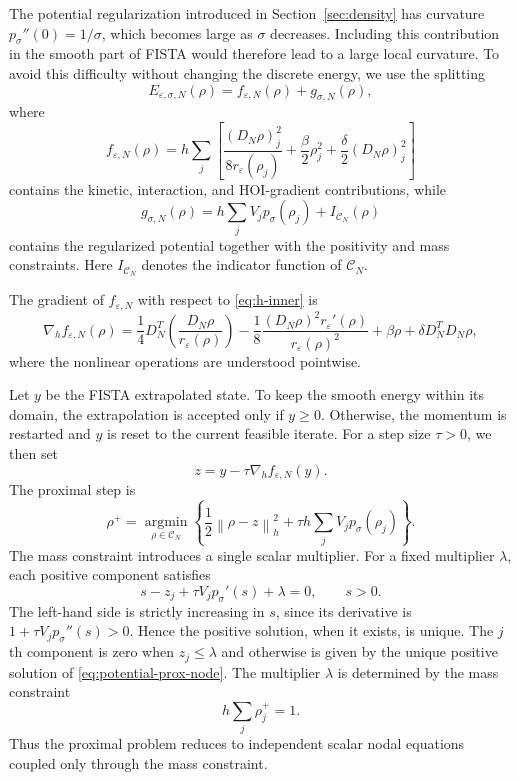 \documentclass[11pt]{article}
\newcommand{\CN}{\mathcal{C}_N}
\newcommand{\eps}{\varepsilon}
\newcommand{\sig}{\sigma}
\newcommand{\norm}[1]{\left\|#1\right\|}
\theoremstyle{plain}
\theoremstyle{definition}
\numberwithin{equation}{section}
\begin{document}
The potential regularization introduced in Section~\ref{sec:density}
has curvature $p_\sig''(0)=1/\sig$, which becomes large as $\sig$
decreases. Including this contribution in the smooth part of FISTA
would therefore lead to a large local curvature. To avoid this
difficulty without changing the discrete energy, we use the splitting
\begin{equation}
\label{eq:f-plus-g}
E_{\eps,\sig,N}(\rho)
=
f_{\eps,N}(\rho)+g_{\sig,N}(\rho),
\end{equation}
where
\begin{equation}
\label{eq:smooth-part}
f_{\eps,N}(\rho)
=
h\sum_j
\left[
\frac{(D_N\rho)_j^2}{8r_\eps(\rho_j)}
+\frac{\beta}{2}\rho_j^2
+\frac{\delta}{2}(D_N\rho)_j^2
\right]
\end{equation}
contains the kinetic, interaction, and HOI-gradient contributions,
while
\begin{equation}
\label{eq:prox-part}
g_{\sig,N}(\rho)
=
h\sum_j V_jp_\sig(\rho_j)
+
I_{\CN}(\rho)
\end{equation}
contains the regularized potential together with the positivity and
mass constraints. Here $I_{\CN}$ denotes the indicator function of
$\CN$.

The gradient of $f_{\eps,N}$ with respect to
\eqref{eq:h-inner} is
\begin{equation}
\label{eq:smooth-gradient}
\nabla_h f_{\eps,N}(\rho)
=
\frac14D_N^T
\left(
\frac{D_N\rho}{r_\eps(\rho)}
\right)
-\frac18
\frac{(D_N\rho)^2r_\eps'(\rho)}
     {r_\eps(\rho)^2}
+\beta\rho
+\delta D_N^TD_N\rho,
\end{equation}
where the nonlinear operations are understood pointwise.


Let $y$ be the FISTA extrapolated state. To keep the smooth energy
within its domain, the extrapolation is accepted only if $y\ge0$.
Otherwise, the momentum is restarted and $y$ is reset to the current
feasible iterate. For a step size $\tau>0$, we then set
\[
z=y-\tau\nabla_h f_{\eps,N}(y).
\]
The proximal step is
\begin{equation}
\label{eq:potential-prox}
\rho^+
=
\operatorname*{argmin}_{\rho\in\CN}
\left\{
\frac12\norm{\rho-z}_h^2
+
\tau h\sum_jV_jp_\sig(\rho_j)
\right\}.
\end{equation}
The mass constraint introduces a single scalar multiplier. For a
fixed multiplier $\lambda$, each positive component satisfies
\begin{equation}
\label{eq:potential-prox-node}
s-z_j
+\tau V_j p_\sig'(s)
+\lambda
=
0,
\qquad s>0.
\end{equation}
The left-hand side is strictly increasing in $s$, since its derivative
is $1+\tau V_jp_\sig''(s)>0$. Hence the positive solution, when it
exists, is unique. The $j$th component is zero when $z_j\le\lambda$
and otherwise is given by the unique positive solution of
\eqref{eq:potential-prox-node}. The multiplier $\lambda$ is determined
by the mass constraint
\[
h\sum_j\rho_j^+=1.
\]
Thus the proximal problem reduces to independent scalar nodal
equations coupled only through the mass constraint.
\end{document}
